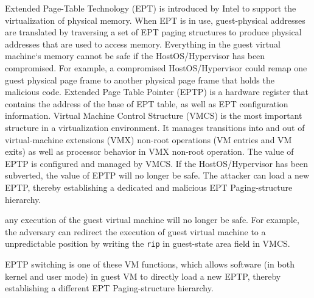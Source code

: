 \iffalse
In this paper, we introduce a novel scheme, named HyperPS, to implement hypervisor monitoring based on privilege separation without relying on any special hardware or reconstructing the hypervisor. The key idea of HyperPS is to separate the core virtualization privileges, especially the privileges of managing the physical memory, into an isolated execution environment alongside the HostOS kernel,
so that the security of virtual machines can be strongly protected, even if the HostOS/hypervisor has been compromised. Our isolated execution does not rely on a special hardware feature, nor demand a higher privilege level. Our isolated execution actually shares the same privilege level with the HostOS kernel. 
\fi
Extended Page-Table Technology (EPT) is introduced by Intel to support the virtualization of physical memory.
When EPT is in use, guest-physical addresses are translated by traversing a set of EPT paging structures to produce physical addresses that are used to access memory. Everything in the guest virtual machine`s memory cannot be safe if the HostOS/Hypervisor has been compromised. For example, a compromised HostOS/Hypervisor could remap one guest physical page frame to another physical page frame that holds the malicious code.
Extended Page Table Pointer (EPTP) is a hardware register that contains the address of the base of EPT table, as well as EPT configuration information. 
Virtual Machine Control Structure (VMCS) is the most important structure in a virtualization environment. It manages transitions into and out of virtual-machine extensions (VMX) non-root operations (VM entries and VM exits) as well as processor behavior in VMX non-root operation. 
The value of EPTP is configured and managed by VMCS. 
If the HostOS/Hypervisor has been subverted, the value of EPTP will no longer be safe. The attacker can load a new EPTP, thereby establishing a dedicated and malicious EPT Paging-structure hierarchy. 

\iffalse
any execution of the guest virtual machine will no longer be safe. 
For example, the adversary can redirect the execution of guest virtual machine to a unpredictable position by writing the \verb|rip| in guest-state area field in VMCS.

EPTP switching is one of these VM functions, which allows software (in both kernel and user mode) in guest VM to directly load a new EPTP, thereby establishing a different EPT Paging-structure hierarchy. 

